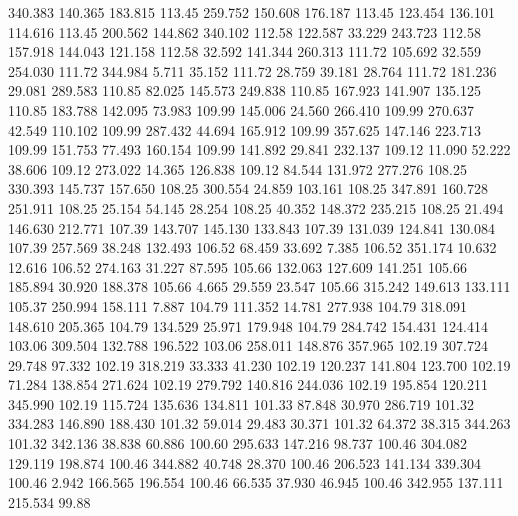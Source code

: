  340.383  140.365  183.815       113.45
 259.752  150.608  176.187       113.45
 123.454  136.101  114.616       113.45
 200.562  144.862  340.102       112.58
 122.587   33.229  243.723       112.58
 157.918  144.043  121.158       112.58
  32.592  141.344  260.313       111.72
 105.692   32.559  254.030       111.72
 344.984    5.711   35.152       111.72
  28.759   39.181   28.764       111.72
 181.236   29.081  289.583       110.85
  82.025  145.573  249.838       110.85
 167.923  141.907  135.125       110.85
 183.788  142.095   73.983       109.99
 145.006   24.560  266.410       109.99
 270.637   42.549  110.102       109.99
 287.432   44.694  165.912       109.99
 357.625  147.146  223.713       109.99
 151.753   77.493  160.154       109.99
 141.892   29.841  232.137       109.12
  11.090   52.222   38.606       109.12
 273.022   14.365  126.838       109.12
  84.544  131.972  277.276       108.25
 330.393  145.737  157.650       108.25
 300.554   24.859  103.161       108.25
 347.891  160.728  251.911       108.25
  25.154   54.145   28.254       108.25
  40.352  148.372  235.215       108.25
  21.494  146.630  212.771       107.39
 143.707  145.130  133.843       107.39
 131.039  124.841  130.084       107.39
 257.569   38.248  132.493       106.52
  68.459   33.692    7.385       106.52
 351.174   10.632   12.616       106.52
 274.163   31.227   87.595       105.66
 132.063  127.609  141.251       105.66
 185.894   30.920  188.378       105.66
   4.665   29.559   23.547       105.66
 315.242  149.613  133.111       105.37
 250.994  158.111    7.887       104.79
 111.352   14.781  277.938       104.79
 318.091  148.610  205.365       104.79
 134.529   25.971  179.948       104.79
 284.742  154.431  124.414       103.06
 309.504  132.788  196.522       103.06
 258.011  148.876  357.965       102.19
 307.724   29.748   97.332       102.19
 318.219   33.333   41.230       102.19
 120.237  141.804  123.700       102.19
  71.284  138.854  271.624       102.19
 279.792  140.816  244.036       102.19
 195.854  120.211  345.990       102.19
 115.724  135.636  134.811       101.33
  87.848   30.970  286.719       101.32
 334.283  146.890  188.430       101.32
  59.014   29.483   30.371       101.32
  64.372   38.315  344.263       101.32
 342.136   38.838   60.886       100.60
 295.633  147.216   98.737       100.46
 304.082  129.119  198.874       100.46
 344.882   40.748   28.370       100.46
 206.523  141.134  339.304       100.46
   2.942  166.565  196.554       100.46
  66.535   37.930   46.945       100.46
 342.955  137.111  215.534        99.88
